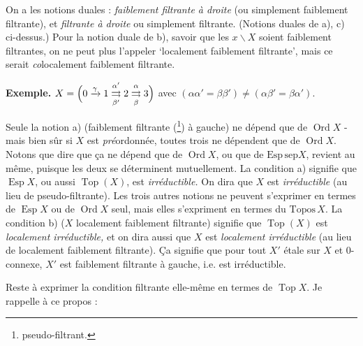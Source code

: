 \documentclass[11pt]{article}
\newcommand{\printedpage}[1]{\marginpar{\footnotesize p.~#1}}
\newcommand{\msp}[1]{\marginpar{\footnotesize [#1]}}
\begin{document}
\printedpage{11}

\noindent On a les notions duales : \textit{faiblement filtrante à droite} (ou simplement faiblement filtrante), et \textit{filtrante à droite} ou simplement filtrante. (Notions duales de a), c) ci-dessus.) Pour la notion duale de b), savoir que les $x\backslash X$ soient faiblement filtrantes, on ne peut plus l'appeler `localement faiblement filtrante', mais ce serait \textit{co}localement faiblement filtrante.

\noindent\textbf{Exemple.} $X = \Bigl(0 \xrightarrow{\gamma} 1 \underset{\beta'}{\overset{\alpha'}{\rightrightarrows}} 2 \underset{\beta}{\overset{\alpha}{\rightrightarrows}} 3\Bigr)$ avec $(\alpha\alpha' = \beta\beta') \neq (\alpha\beta' = \beta\alpha')$.

\msp{page 17}

\noindent Seule la notion a) (faiblement filtrante (\footnote[22]{pseudo-filtrant.}) à gauche) ne dépend que de $\operatorname{Ord} X$ - mais bien sûr si $X$ est \textit{pré}ordonnée, toutes trois ne dépendent que de $\operatorname{Ord} X$. Notons que dire que ça ne dépend que de $\operatorname{Ord} X$, ou que de $\mathrm{Esp}\,\mathrm{sep}X$, revient au même, puisque les deux se déterminent mutuellement. La condition a) signifie que $\operatorname{Esp} X$, ou aussi $\operatorname{Top}(X)$, est \textit{irréductible.} On dira que $X$ est \textit{irréductible} (au lieu de pseudo-filtrante). Les trois autres notions ne peuvent s'exprimer en termes de $\operatorname{Esp} X$ ou de $\operatorname{Ord} X$ seul, mais elles s'expriment en termes du $\mathrm{Topos}\, X$. La condition b) ($X$ localement faiblement filtrante) signifie que $\operatorname{Top}(X)$ est \textit{localement irréductible,} et on dira aussi que $X$ est \textit{localement irréductible} (au lieu de localement faiblement filtrante). Ça signifie que pour tout $X'$ étale sur $X$ et 0-connexe, $X'$ est faiblement filtrante à gauche, i.e. est irréductible.

Reste à exprimer la condition filtrante elle-même en termes de $\operatorname{Top} X$. Je rappelle à ce propos :
\end{document}
